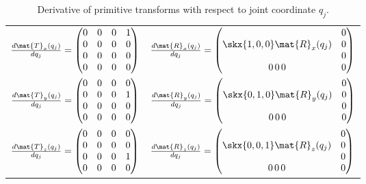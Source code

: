 \documentclass[11pt]{article}
\begin{document}
\begin{table}
\centering
\begin{tabular}{|l|l|} \hline
$\frac{d \mat{T}_x(q_j)}{dq_j} = \begin{pmatrix} 0 & 0 & 0 & 1 \\ 0 & 0 & 0 & 0 \\ 0 & 0 & 0 & 0 \\ 0 & 0 & 0 & 0\end{pmatrix} $ & $\frac{d \mat{R}_x(q_j)}{dq_j} =\begin{pmatrix} \skx{1,0,0} \mat{R}_x(q_j) & \begin{matrix} 0 \\ 0 \\ 0 \end{matrix} \\ 0\, 0\, 0 & 0 \end{pmatrix}  $\\
$\frac{d \mat{T}_y(q_j)}{dq_j} =\begin{pmatrix} 0 & 0 & 0 & 0 \\ 0 & 0 & 0 & 1 \\ 0 & 0 & 0 & 0 \\ 0 & 0 & 0 & 0\end{pmatrix} $ & $\frac{d \mat{R}_y(q_j)}{dq_j} =\begin{pmatrix} \skx{0,1,0} \mat{R}_y(q_j) & \begin{matrix} 0 \\ 0 \\ 0 \end{matrix} \\ 0\, 0\, 0 & 0 \end{pmatrix}  $\\
$\frac{d \mat{T}_z(q_j)}{dq_j} =\begin{pmatrix} 0 & 0 & 0 & 0 \\ 0 & 0 & 0 & 0 \\ 0 & 0 & 0 & 1 \\ 0 & 0 & 0 & 0\end{pmatrix} $ & 
$\frac{d \mat{R}_z(q_j)}{dq_j} =\begin{pmatrix} \skx{0,0,1} \mat{R}_z(q_j) & \begin{matrix} 0 \\ 0 \\ 0 \end{matrix} \\ 0\, 0\, 0 & 0 \end{pmatrix}  $\\ \hline
\end{tabular}
\caption{Derivative of primitive transforms with respect to joint coordinate $q_j$.}
\label{tab:derivs}
\end{table}
\end{document}
